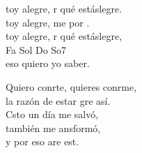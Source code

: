\begin{cancion}%
	\begin{chorus}%
	toy alegre, r qué estáslegre.\\
	toy alegre, me por . \\
	toy alegre, r qué estáslegre,\\
 Fa      Sol    Do  So7\\
eso quiero yo saber.\\
	\end{chorus}%
	Quiero conrte, quieres conrme,\\
	la razón de estar gre así.\\
	Csto un día me salvó,\\
	también me ansformó,\\
	y por eso are est.\\
\end{cancion}%
